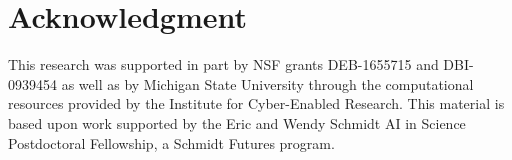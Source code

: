 \section*{Acknowledgment}

This research was supported in part by NSF grants DEB-1655715 and DBI-0939454 as well as by Michigan State University through the computational resources provided by the Institute for Cyber-Enabled Research.
This material is based upon work supported by the Eric and Wendy Schmidt AI in Science Postdoctoral Fellowship, a Schmidt Futures program.
